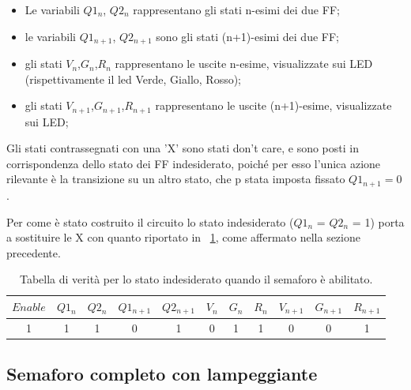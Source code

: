 \documentclass[a4paper,10pt]{article}
\begin{document}
\begin{itemize}
	\item Le variabili $Q1_n$, $Q2_n$ rappresentano gli stati n-esimi dei due FF;
	\item le variabili $Q1_{n+1}$, $Q2_{n+1}$ sono gli stati (n+1)-esimi dei due FF;
	\item gli stati $V_n$,$G_n$,$R_n$ rappresentano le uscite n-esime, visualizzate sui LED (rispettivamente il led Verde, Giallo, Rosso);
	\item gli stati $V_{n+1}$,$G_{n+1}$,$R_{n+1}$ rappresentano le uscite (n+1)-esime, visualizzate sui LED;
\end{itemize}
Gli stati contrassegnati con una 'X' sono stati don't care, e sono posti in corrispondenza dello stato dei FF indesiderato, poiché per esso l'unica azione rilevante è la transizione su un altro stato, che p stata imposta fissato $ Q1_{n+1} = 0 $.

Per come è stato costruito il circuito lo stato indesiderato ($Q1_n$ = $Q2_n$ = 1) porta a sostituire le X con quanto riportato in \tablename{~\ref{tab:inde}}, come affermato nella sezione precedente.

\begin{table}[H]
	\centering
	\begin{tabular}{c|cc|cc|ccc|ccc}
		\hline
		$Enable$ & $Q1_n$ &	$Q2_n$ & $Q1_{n+1}$ & $Q2_{n+1}$ & $V_n$ & $G_n$ & $R_n$ & $V_{n+1}$ & $G_{n+1}$ & $R_{n+1}$ \\
		\hline
		1 & 1 & 1 & 0 & 1 & 0 &  1 & 1 & 0 & 0 & 1  \\
		\hline
	\end{tabular}
	\caption{Tabella di verità per lo stato indesiderato quando il semaforo è abilitato.}
	\label{tab:inde}
\end{table}
%

\subsection{Semaforo completo con lampeggiante}
\end{document}
